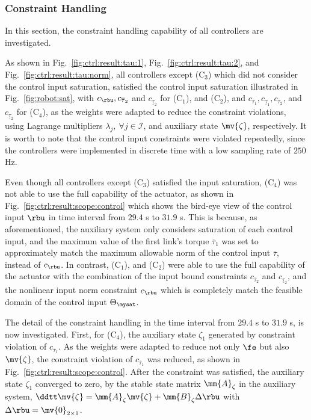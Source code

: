 \documentclass[lettersize,journal]{IEEEtran}
\begin{document}
\hfill
\subsubsection{Constraint Handling} \label{sec:sim:constraint}

In this section, the constraint handling capability of all controllers are investigated.

\hfill

As shown in Fig.~\ref{fig:ctrl:result:tau:1}, Fig.~\ref{fig:ctrl:result:tau:2}, and Fig.~\ref{fig:ctrl:result:tau:norm}, all controllers except (C$_3$) which did not consider the control input saturation, satisfied the control input saturation illustrated in Fig.~\ref{fig:robot:sat}, with $c_{\rbu},c_{\overline\tau_2}$ and $c_{\underline\tau_2}$ for (C$_1$), and (C$_2$), and $c_{\overline\tau_1},c_{\underline\tau_1},c_{\overline\tau_2}$, and $c_{\underline\tau_2}$ for (C$_4$), as the weights were adapted to reduce the constraint violations, using Lagrange multipliers $\lambda_j,\ \forall j\in\mathcal{I}$, and auxiliary state $\mv{\zeta}$, respectively.
It is worth to note that the control input constraints were violated repeatedly, since the controllers were implemented in discrete time with a low sampling rate of $250$ Hz.

\hfill

Even though all controllers except (C$_3$) satisfied the input saturation, (C$_4$) was not able to use the full capability of the actuator, as shown in Fig.~\ref{fig:ctrl:result:scope:control} which shows the bird-eye view of the control input $\rbu$ in time interval from $29.4$ s to $31.9$ s.
This is because, as aforementioned, the auxiliary system only considers saturation of each control input, and the maximum value of the first link's torque $\overline{\tau}_1$ was set to approximately match the maximum allowable norm of the control input $\overline\tau$, instead of $c_{\rbu}$.
In contrast, (C$_1$), and (C$_2$) were able to use the full capability of the actuator with the combination of the input bound constraints $c_{\overline\tau_2}$ and $c_{\underline\tau_2}$, and the nonlinear input norm constraint $c_{\rbu}$ which is completely match the feasible domain of the control input $\Theta_{\mysat}$.

\hfill

The detail of the constraint handling in the time interval from $29.4$ s to $31.9$ s, is now investigated.
First, for (C$_4$), the auxiliary state $\zeta_1$ generated by constraint violation of $c_{\overline\tau_1}$. 
As the weights were adapted to reduce not only $\fe$ but also $\mv{\zeta}$, the constraint violation of $c_{\overline\tau_1}$ was reduced, as shown in Fig.~\ref{fig:ctrl:result:scope:control}.
After the constraint was satisfied, the auxiliary state $\zeta_1$ converged to zero, by the stable state matrix $\mm{A}_\zeta$ in the auxiliary system, \ie $\ddtt\mv{\zeta} = \mm{A}_\zeta \mv{\zeta} + \mm{B}_\zeta \Delta\rbu$ with $\Delta\rbu=\mv{0}_{2\times1}$.
\end{document}
